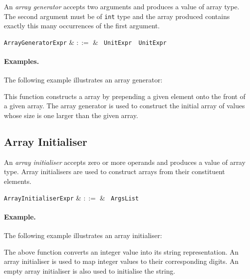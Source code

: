 An {\em array generator} accepts two arguments and produces a value of array type.  The second argument must be of \lstinline{int} type and the array produced contains exactly this many occurrences of the first argument.

\begin{syntax}
  \verb+ArrayGeneratorExpr+ & $::=$ & \token{[}\ \verb+UnitExpr+\ \token{;}\ \verb+UnitExpr+\ \token{]}\\
\end{syntax}

\paragraph{Examples.} The following example illustrates an array generator:



This function constructs a array by prepending a given element onto the front of a given array.  The array generator is used to construct the initial array of values whose size is one larger than the given array.


\subsection{Array Initialiser}
\label{c_expr_array_initialiser}
An {\em array initialiser} accepts zero or more operands and produces a value of array type.  Array initialisers are used to construct arrays from their constituent elements.  

\begin{syntax}
  \verb+ArrayInitialiserExpr+ & $::=$ & \token{[}\ \verb+ArgsList+ \token{]}\\
\end{syntax}

\paragraph{Example.}  The following example illustrates an array initialiser:



The above function converts an integer value into its string representation.  An array initialiser is used to map integer values to their corresponding digits.  An empty array initialiser is also used to initialise the string.

